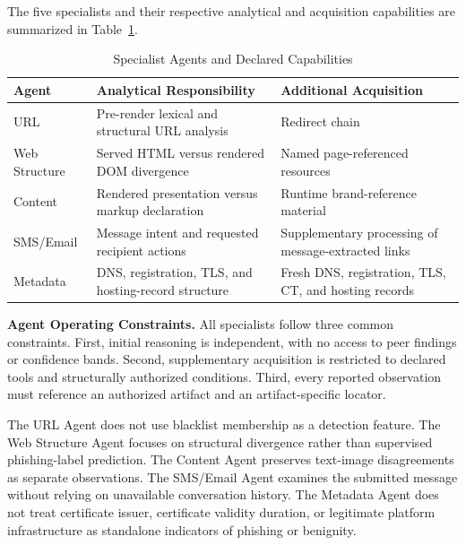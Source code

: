 The five specialists and their respective
analytical and acquisition capabilities
are summarized in Table~\ref{tab:specialists}.

\begin{table}[!t]
\caption{Specialist Agents and Declared Capabilities}
\label{tab:specialists}
\centering
\scriptsize
\renewcommand{\arraystretch}{1.12}
\setlength{\tabcolsep}{3pt}
\begin{tabular}{p{}
                p{}
                p{}}
\toprule
\textbf{Agent} &
\textbf{Analytical Responsibility} &
\textbf{Additional Acquisition} \\
\midrule
URL &
Pre-render lexical and structural
URL analysis &
Redirect chain \\
\addlinespace
Web Structure &
Served HTML versus rendered
DOM divergence &
Named page-referenced resources \\
\addlinespace
Content &
Rendered presentation versus
markup declaration &
Runtime brand-reference material \\
\addlinespace
SMS/Email &
Message intent and requested
recipient actions &
Supplementary processing of
message-extracted links \\
\addlinespace
Metadata &
DNS, registration, TLS, and
hosting-record structure &
Fresh DNS, registration, TLS,
CT, and hosting records \\
\bottomrule
\end{tabular}
\end{table}

\noindent\textbf{Agent Operating Constraints.}
All specialists follow three common
constraints. First, initial reasoning
is independent, with no access to peer
findings or confidence bands. Second,
supplementary acquisition is restricted
to declared tools and structurally
authorized conditions. Third, every
reported observation must reference
an authorized artifact and an
artifact-specific locator.

The URL Agent does not use blacklist
membership as a detection feature.
The Web Structure Agent focuses on
structural divergence rather than
supervised phishing-label prediction.
The Content Agent preserves text-image
disagreements as separate observations.
The SMS/Email Agent examines the submitted
message without relying on unavailable
conversation history. The Metadata Agent
does not treat certificate issuer,
certificate validity duration, or
legitimate platform infrastructure as
standalone indicators of phishing
or benignity.

